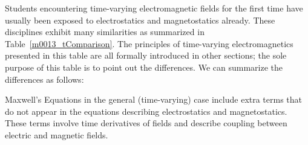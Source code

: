

\label{m0013_Comparison_of_Static_and_Time-Varying_Electromagnetics} %

Students encountering time-varying electromagnetic fields for the first time have usually been exposed to electrostatics and magnetostatics already.
These disciplines exhibit many similarities as summarized in Table~\ref{m0013_tComparison}.
The principles of time-varying electromagnetics presented in this table are all formally introduced in other sections; the sole purpose of this table is to point out the differences. 
We can summarize the differences as follows:
%
\begin{mdframed}[backgroundcolor=yellow!20,nobreak=true] 
Maxwell's Equations in the general (time-varying) case include extra terms that do not appear in the equations describing electrostatics and magnetostatics.
These terms involve time derivatives of fields and describe coupling between electric and magnetic fields.
\end{mdframed}  
%
